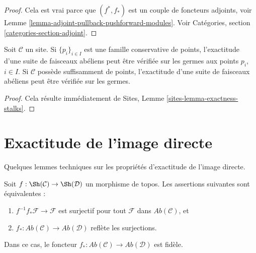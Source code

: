 \begin{proof}
Cela est vrai parce que $(f^*, f_*)$ est un couple de foncteurs adjoints, voir
Lemme \ref{lemma-adjoint-pullback-pushforward-modules}. Voir Catégories,
section \ref{categories-section-adjoint}.
\end{proof}

\begin{lemma}
\label{lemma-check-exactness-stalks}
Soit $\mathcal{C}$ un site. Si $\{p_i\}_{i \in I}$ est une famille conservative
de points, l'exactitude d'une suite de faisceaux abéliens peut être vérifiée sur
les germes aux points $p_i$, $i \in I$. Si $\mathcal{C}$ possède suffisamment
de points, l'exactitude d'une suite de faisceaux abéliens peut être vérifiée sur
les germes.
\end{lemma}

\begin{proof}
Cela résulte immédiatement de Sites, Lemme
\ref{sites-lemma-exactness-stalks}.
\end{proof}





\section{Exactitude de l'image directe}
\label{section-pushforward}

\noindent
Quelques lemmes techniques sur les propriétés d'exactitude de l'image directe.

\begin{lemma}
\label{lemma-reflect-surjections}
Soit $f : \Sh(\mathcal{C}) \to \Sh(\mathcal{D})$ un morphisme de topos. Les
assertions suivantes sont équivalentes :
\begin{enumerate}
\item $f^{-1}f_*\mathcal{F} \to \mathcal{F}$ est surjectif pour tout
$\mathcal{F}$ dans $\textit{Ab}(\mathcal{C})$, et
\item $f_* : \textit{Ab}(\mathcal{C}) \to \textit{Ab}(\mathcal{D})$
reflète les surjections.
\end{enumerate}
Dans ce cas, le foncteur
$f_* : \textit{Ab}(\mathcal{C}) \to \textit{Ab}(\mathcal{D})$
est fidèle.
\end{lemma}

